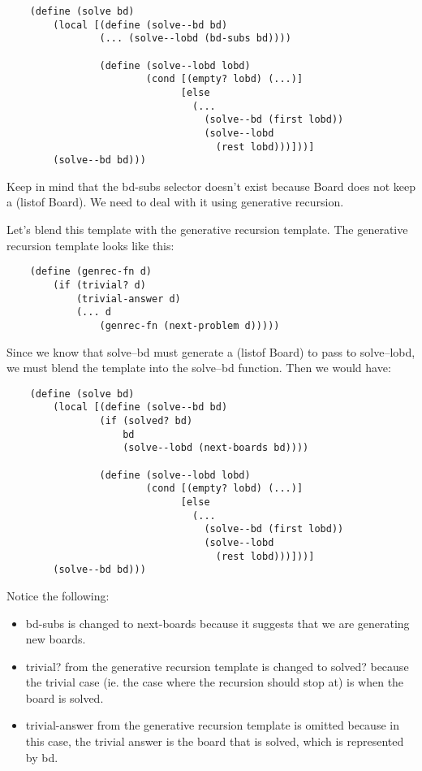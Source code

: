 \documentclass[11pt,a4paper]{report}
\begin{document}
	\begin{verbatim}
	(define (solve bd)
		(local [(define (solve--bd bd)
		        (... (solve--lobd (bd-subs bd))))
		        
		        (define (solve--lobd lobd)
		                (cond [(empty? lobd) (...)]
		                      [else
		                        (... 
		                          (solve--bd (first lobd))
		                          (solve--lobd 
		                            (rest lobd)))]))]
		(solve--bd bd)))
	\end{verbatim}
	
	Keep in mind that the bd-subs selector doesn't exist because Board does not keep a (listof
	Board). We need to deal with it using generative recursion.
	
	Let's blend this template with the generative recursion template. The generative recursion
	template looks like this:
	
	\begin{verbatim}
	(define (genrec-fn d)
		(if (trivial? d)
		    (trivial-answer d)
		    (... d
		        (genrec-fn (next-problem d)))))
	\end{verbatim}
	
	Since we know that solve--bd must generate a (listof Board) to pass to solve--lobd, we must
	blend the template into the solve--bd function. Then we would have:
	
	\begin{verbatim}
	(define (solve bd)
		(local [(define (solve--bd bd)
		        (if (solved? bd)
		            bd
		            (solve--lobd (next-boards bd))))
		            
		        (define (solve--lobd lobd)
		                (cond [(empty? lobd) (...)]
		                      [else
		                        (... 
		                          (solve--bd (first lobd))
		                          (solve--lobd 
		                            (rest lobd)))]))]
		(solve--bd bd)))
	\end{verbatim}
	
	Notice the following:
	\begin{itemize}
		\item bd-subs is changed to next-boards because it suggests that we are generating new boards.
		\item trivial? from the generative recursion template is changed to solved? because the trivial
		case (ie. the case where the recursion should stop at) is when the board is solved.
		\item trivial-answer from the generative recursion template is omitted because in this case, the
		trivial answer is the board that is solved, which is represented by bd.
	\end{itemize}
\end{document}
